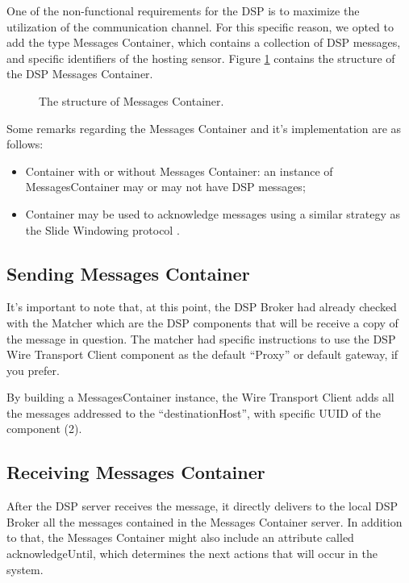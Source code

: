\documentclass[conference]{IEEEtran}
\begin{document}
One of the non-functional requirements for the DSP is to maximize the
utilization of the communication channel. For this specific reason, we opted to
add the type Messages Container, which contains a collection of DSP messages,
and specific identifiers of the hosting sensor. Figure
\ref{FIG_DSP_MSGS_CONTAINER} contains the structure of the DSP Messages
Container.

\begin{figure}[!htb]
\centering
{}
\caption{\label{FIG_DSP_MSGS_CONTAINER} The structure of Messages Container.}
\end{figure}

Some remarks regarding the Messages Container and it's implementation are as
follows:

\begin{itemize}
  \item Container with or without Messages Container: an instance of
  MessagesContainer may or may not have DSP messages;
  \item Container may be used to acknowledge messages using a similar strategy
  as the Slide Windowing protocol \cite{slide-window}. 
\end{itemize}

\subsection{Sending Messages Container}

It's important to note that, at this point, the DSP Broker had already checked
with the Matcher which are the DSP components that will be receive a copy of
the message in question. The matcher had specific instructions to use the DSP
Wire Transport Client component as the default ``Proxy'' or default gateway, if
you prefer.

By building a MessagesContainer instance, the Wire Transport Client adds all
the messages addressed to the ``destinationHost'', with specific UUID of
the component (2).

\subsection{Receiving Messages Container}

After the DSP server receives the message, it directly delivers to the
local DSP Broker all the messages contained in the Messages Container server.
In addition to that, the Messages Container might also include an attribute
called acknowledgeUntil, which determines the next actions that will occur in
the system.
\end{document}
